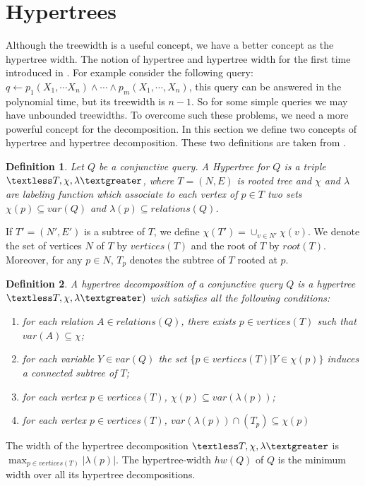 \documentclass[12pt]{article}
\newtheorem{definition}{Definition}
\begin{document}
\section{Hypertrees}
Although the treewidth is a useful concept, we have a better concept as the hypertree width. The notion of hypertree and hypertree width for the first time introduced in \cite{1}. For example consider the following query: $q\gets p_{1}(X_{1},\cdots X_{n})\land\cdots\land p_{m}(X_{1},\cdots,X_{n})$, this query can be answered in the polynomial time, but its treewidth is $n-1$. So for some simple queries we may have unbounded treewidths. To overcome such these problems, we need a more powerful concept for the decomposition.
In this section we define two concepts of hypertree and hypertree decomposition. 
These two definitions are taken from \cite{1}.
\begin{definition}
\label{def:ht}
Let $Q$ be a conjunctive query. A Hypertree for $Q$ is a triple $\textless T,\chi,\lambda\textgreater$, where  $T=(N,E)$ is rooted tree and $\chi$ and $\lambda$ are labeling function which associate to each vertex of $p\in T$ two sets $\chi(p)\subseteq var(Q)$ and $\lambda(p)\subseteq relations(Q)$.
\end{definition}
If $T'=(N',E')$ is a subtree of $T$, we define $\chi(T')=\cup_{v\in N'}\chi(v)$. We denote the set of vertices $N$ of $T$ by $vertices(T)$ and the root of $T$ by $root(T)$. Moreover, for any $p\in N$, $T_{p}$ denotes the subtree of $T$ rooted at $p$.
\begin{definition}
\label{def:htd}
A hypertree decomposition of a conjunctive query $Q$ is a hypertree $\textless T,\chi,\lambda\textgreater)$ wich satisfies all the following conditions:
\begin{enumerate}
\item for each relation $A\in relations(Q)$, there exists $p\in vertices(T)$ such that $var(A)\subseteq \chi$;
\item for each variable $Y\in var(Q)$ the set $\{p\in vertices(T)|Y\in\chi(p)\}$ induces a connected subtree of $T$;\label{connectedness}
\item for each vertex $p\in vertices(T)$, $\chi(p)\subseteq var(\lambda(p))$;
\item for each vertex $p\in vertices(T)$, $var(\lambda(p))\cap(T_{p})\subseteq \chi(p)$
\end{enumerate}
\end{definition}
The width of the hypertree decomposition $\textless T,\chi,\lambda\textgreater$ is $\max_{p\in vertices(T)}|\lambda(p)|$. The hypertree-width $hw(Q)$ of $Q$ is the minimum width over all its hypertree decompositions.\par
\end{document}
